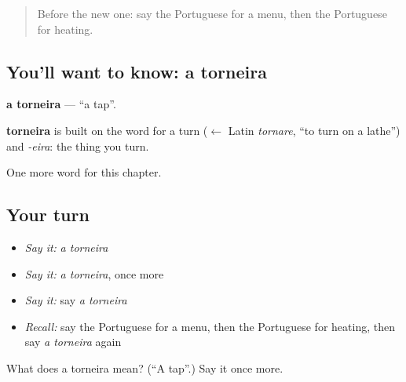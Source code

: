 \begin{quote}
Before the new one: say the Portuguese for a menu, then the Portuguese for heating.
\end{quote}

\subsection*{You'll want to know: a torneira}
\textbf{a torneira} — \textquotedblleft{}a tap\textquotedblright{}.

\begin{cousinweb}
\textbf{torneira} is built on the word for a turn ($\leftarrow$ Latin \emph{tornare}, \textquotedblleft{}to turn on a lathe\textquotedblright{}) and \emph{-eira}: the thing you turn.
\end{cousinweb}

\begin{grammarlens}[title={What you've built}]
One more word for this chapter.
\end{grammarlens}

\subsection*{Your turn}
\begin{itemize}
\raggedright
  \item \emph{Say it:} \emph{a torneira}
  \item \emph{Say it:} \emph{a torneira}, once more
  \item \emph{Say it:} say \emph{a torneira}
  \item \emph{Recall:} say the Portuguese for a menu, then the Portuguese for heating, then say \emph{a torneira} again
\end{itemize}

\begin{tcolorbox}[breakable,colback=teal!4,colframe=teal!35!black,title={Before you move on}]
What does a torneira mean? (\textquotedblleft{}A tap\textquotedblright{}.) Say it once more.
\end{tcolorbox}
